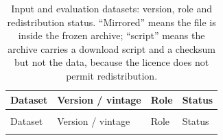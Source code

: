 \documentclass[12pt,a4paper]{article}
\begin{document}
\begingroup\small
\setlength{\LTcapwidth}{\linewidth}
\begin{xltabular}{\linewidth}{@{}>{\raggedright\arraybackslash}p{3.1cm} >{\raggedright\arraybackslash}p{2.3cm} L L@{}}
\caption{Input and evaluation datasets: version, role and redistribution status. ``Mirrored''
means the file is inside the frozen archive; ``script'' means the archive carries a download
script and a checksum but not the data, because the licence does not permit redistribution.}\label{tab:data}\\
\toprule
Dataset & Version / vintage & Role & Status \\
\midrule
\endfirsthead
{}\\
\toprule
Dataset & Version / vintage & Role & Status \\
\midrule
\endhead
\bottomrule
\endlastfoot


\end{xltabular}
\end{document}
